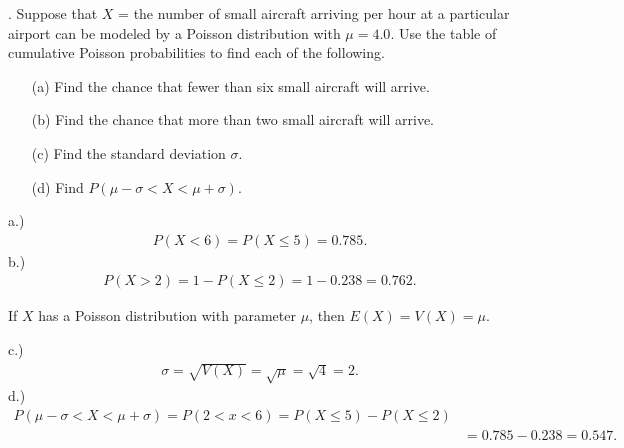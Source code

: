 \documentclass{report}
\begin{document}
 \pagebreak \bigbreak \noindent 
 \begin{mdframed}
     . Suppose that \( X \) = the number of small aircraft arriving per hour at a particular airport can be modeled by a Poisson distribution with \( \mu = 4.0 \). Use the table of cumulative Poisson probabilities to find each of the following.
     \begin{itemize}
         \item[(a)] Find the chance that fewer than six small aircraft will arrive.
         \item[(b)] Find the chance that more than two small aircraft will arrive.
         \item[(c)] Find the standard deviation \( \sigma \).
         \item[(d)] Find \( P(\mu - \sigma < X < \mu + \sigma) \).
     \end{itemize}
 \end{mdframed}
 \bigbreak \noindent 
 a.) 
\begin{align*}
     P(X < 6) = P(X \leq 5) = 0.785
 .\end{align*}
 \bigbreak \noindent 
 b.)
 \begin{align*}
     P(X > 2) = 1-P(X \leq 2) = 1-0.238  =0.762
 .\end{align*}
 \bigbreak \noindent 
 \begin{remark}
     If \( X \) has a Poisson distribution with parameter \( \mu \), then \( E(X) = V(X) = \mu \).
 \end{remark}
 \bigbreak \noindent 
 c.)
 \begin{align*}
     \sigma = \sqrt{V(X)} = \sqrt{\mu} = \sqrt{4} = 2
 .\end{align*}
 \bigbreak \noindent 
 d.)
 \begin{align*}
     P( \mu - \sigma < X < \mu + \sigma) = P(2 < x < 6) = P(X \leq 5) - P(X \leq 2) \\
     &=0.785 -  0.238 =0.547
 .\end{align*}
 




 
\end{document}
